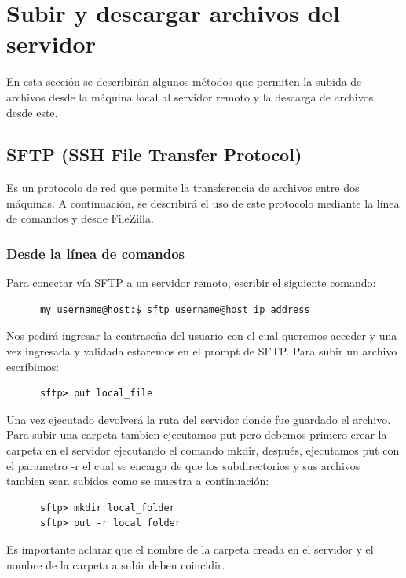 \documentclass[12pt]{article}
\begin{document}
\section{Subir y descargar archivos del servidor}
En esta secci\'on se describir\'an algunos m\'etodos que permiten la subida de archivos desde
la m\'aquina local al servidor remoto y la descarga de archivos desde este.
\subsection{SFTP (SSH File Transfer Protocol)}
Es un protocolo de red que permite la transferencia de archivos entre dos m\'aquinas. A continuaci\'on, se describir\'a el uso de este protocolo mediante la l\'inea de comandos y desde FileZilla.
\subsubsection{Desde la l\'inea de comandos}
Para conectar v\'ia SFTP a un servidor remoto, escribir el siguiente comando:
\begin{verbatim}
      my_username@host:$ sftp username@host_ip_address
\end{verbatim}
Nos pedir\'a ingresar la contrase\~na del usuario con el cual queremos acceder y
una vez ingresada y validada estaremos en el prompt de SFTP.
Para subir un archivo escribimos:
\begin{verbatim}
      sftp> put local_file
\end{verbatim}
Una vez ejecutado devolver\'a la ruta del servidor donde fue guardado el archivo.\\
Para subir una carpeta tambien ejecutamos put pero debemos primero crear la carpeta en el servidor ejecutando el comando mkdir, despu\'es, ejecutamos put con el parametro -r el cual se encarga de que los subdirectorios y sus archivos tambien sean subidos como se muestra a continuaci\'on:
\begin{verbatim}
      sftp> mkdir local_folder
      sftp> put -r local_folder
\end{verbatim}
Es importante aclarar que el nombre de la carpeta creada en el servidor y el nombre de la carpeta a subir deben coincidir.
\end{document}
